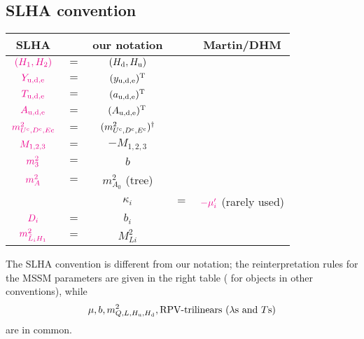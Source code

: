 \documentclass[CheatSheet]{subfiles}
\begin{document}
\newpage
\subsection{SLHA convention}
\begin{wraptable}{r}{220pt}\vspace{-3em}
 \begin{tabular}[t]{c@{\,}c@{\,}c@{\,}c@{\,}c}\toprule
 SLHA  && our notation && Martin/DHM\\\midrule
 ${\color{magenta}(H_1, H_2)}$              &$=$& $(H_{\mathrm{d}}, H_{\mathrm{u}})$ \\\midrule
 ${\color{magenta}Y_{\mathrm{u,d,e}}}$      &$=$& $(y_{\mathrm{u,d,e}})^{\mathrm{T}}$\\
 ${\color{magenta}T_{\mathrm{u,d,e}}}$      &$=$& $(a_{\mathrm{u,d,e}})^{\mathrm{T}}$\\
 ${\color{magenta}A_{\mathrm{u,d,e}}}$      &$=$& $(A_{\mathrm{u,d,e}})^{\mathrm{T}}$\\
 ${\color{magenta}m^2_{U^{\mathrm{c}},D^{\mathrm{c}}, E\mathrm{c}}}$ &$=$& $(m^2_{U^{\mathrm{c}},D^{\mathrm{c}}, E^{\mathrm{c}}})^\dagger$\\
 ${\color{magenta}M_{1,2,3}}$               &$=$& $-M_{1,2,3}$\\
 ${\color{magenta}m_3^2}$                   &$=$& $b$\\
 ${\color{magenta}m_A^2}$                   &$=$& $m^2_{A_0}$ (tree)\\\midrule
 &&$\kappa_i$ &$=$& ${\color{magenta}-\mu_i'}$ \footnotesize{(rarely used)}\\
 ${\color{magenta}D_i}$                     &$=$& $b_i$\\
 ${\color{magenta}m^2_{\tilde L_iH_1}}$     &$=$& $M^2_{Li}$ \\\bottomrule
 \end{tabular}
\end{wraptable}

The SLHA convention \cite{SLHA} is different from our notation; the reinterpretation rules for the MSSM parameters are given in the right table  (\textbf{} for objects in other conventions), while
\begin{equation*}
  \mu, b, m^2_{Q, L, H_{\mathrm{u}}, H_{\mathrm{d}}}, \text{RPV-trilinears ($\lambda$s and $T$s)}
\end{equation*}
 are in common.



\clearpage
\end{document}
